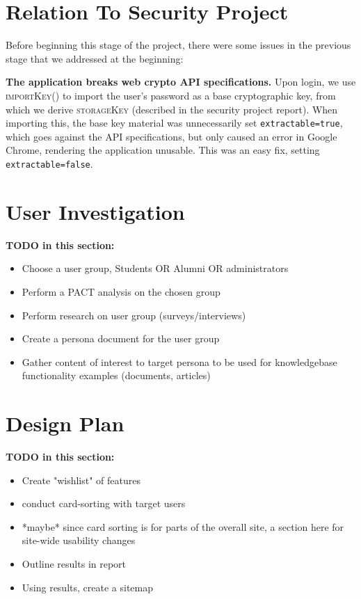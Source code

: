 \documentclass[12pt]{article}
\newcommand{\skey}{\textsc{storageKey} }
\newcommand{\func}[1]{\textsc{#1()}}
\begin{document}
\tableofcontents
\newpage

\section{Relation To Security Project}

Before beginning this stage of the project, there were some issues in the previous stage that we addressed at the beginning:

\textbf{The application breaks web crypto API specifications.} Upon login, we use \func{importKey} to import the user's password as a base cryptographic key, from which we derive \skey (described in the security project report). When importing this, the base key material was unnecessarily set \texttt{extractable=true}, which goes against the API specifications, but only caused an error in Google Chrome, rendering the application unusable. This was an easy fix, setting \texttt{extractable=false}.


\section{User Investigation}

\textbf{TODO in this section:}
\begin{itemize}
    \item Choose a user group, Students OR Alumni OR administrators
    \item Perform a PACT analysis on the chosen group
    \item Perform research on user group (surveys/interviews)
    \item Create a persona document for the user group
    \item Gather content of interest to target persona to be used for knowledgebase functionality examples (documents, articles)
\end{itemize}

\section{Design Plan} %

\textbf{TODO in this section:}
\begin{itemize}
    \item Create "wishlist" of features
    \item conduct card-sorting with target users
    \item *maybe* since card sorting is for parts of the overall site, a section here for site-wide usability changes
    \item Outline results in report
    \item Using results, create a sitemap
\end{itemize}
\end{document}
